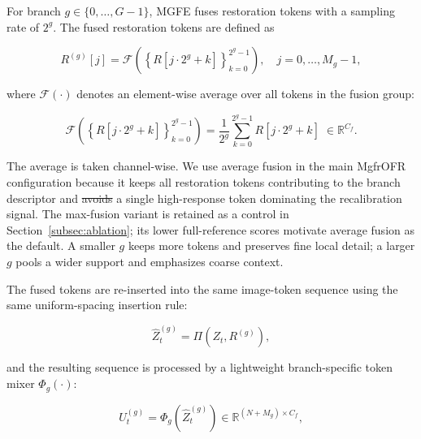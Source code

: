 \documentclass[symmetry,article,submit,pdftex,moreauthors]{Definitions/mdpi}
\providecommand{\DIFadd}[1]{{\protect\color{blue}\uwave{#1}}} %
\providecommand{\DIFdel}[1]{{\protect\color{red}\sout{#1}}}                      %
\providecommand{\DIFaddbegin}{} %
\providecommand{\DIFaddend}{} %
\providecommand{\DIFdelbegin}{} %
\providecommand{\DIFdelend}{} %
\begin{document}
For branch $g \in \{0,\ldots,G-1\}$, MGFE fuses restoration tokens with a sampling rate of $2^g$. The fused restoration tokens are defined as

\begin{equation}
R^{(g)}[j] =
\mathcal{F}\!\left(
\left\{R[j{\cdot}2^g+k]\right\}_{k=0}^{2^g-1}
\right),\quad
j = 0,\ldots,M_g-1,
\end{equation}

where $\mathcal{F}(\cdot)$ denotes an element-wise average over all tokens in the fusion group:

\begin{equation}
\mathcal{F}\!\left(
\left\{R[j\cdot2^g+k]\right\}_{k=0}^{2^g-1}
\right)
= \frac{1}{2^g}\sum_{k=0}^{2^g-1} R[j\cdot2^g+k]\;\in\mathbb{R}^{C_f}.
\label{eq:avg_fusion}
\end{equation}

The average is taken channel-wise. We use average fusion in the main MgfrOFR configuration because it keeps all restoration tokens contributing to the branch descriptor and \DIFdelbegin \DIFdel{avoids }\DIFdelend \DIFaddbegin \DIFadd{prevents }\DIFaddend a single high-response token \DIFaddbegin \DIFadd{from }\DIFaddend dominating the recalibration signal. The max-fusion variant is retained as a control in Section~\ref{subsec:ablation}; its lower full-reference scores motivate average fusion as the default. A smaller $g$ keeps more tokens and preserves fine local detail; a larger $g$ pools a wider support and emphasizes coarse context.

The fused tokens are re-inserted into the same image-token sequence using the same uniform-spacing insertion rule:

\begin{equation}
\widehat{Z}_t^{(g)} = \Pi\!\left(Z_t,R^{(g)}\right),
\end{equation}

and the resulting sequence is processed by a lightweight branch-specific token mixer $\Phi_g(\cdot)$:

\begin{equation}
U_t^{(g)} = \Phi_g\!\left(\widehat{Z}_t^{(g)}\right)
\in \mathbb{R}^{(N+M_g)\times C_f},
\end{equation}
\end{document}
